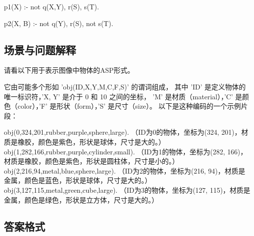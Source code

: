 p1(X) :- not q(X,Y), r(S), s(T).

p2(X, B) :- not q(Y), r(S), not s(T).
\subsection{场景与问题解释}
请看以下用于表示图像中物体的ASP形式。

它由可能多个形如 'obj(ID,X,Y,M,C,F,S)' 的谓词组成，
其中 'ID' 是定义物体的唯一标识符，'X, Y' 是介于 0 和 10 之间的坐标，
'M' 是材质（material），'C' 是颜色（color），'F' 是形状（form），'S' 是尺寸（size）。
以下是这种编码的一个示例片段：

obj(0,324,201,rubber,purple,sphere,large). （ID为0的物体，坐标为(324, 201)，材质是橡胶，颜色是紫色，形状是球体，尺寸是大的。）
obj(1,282,166,rubber,purple,cylinder,small). （ID为1的物体，坐标为(282, 166)，材质是橡胶，颜色是紫色，形状是圆柱体，尺寸是小的。）
obj(2,216,94,metal,blue,sphere,large).   （ID为2的物体，坐标为(216, 94)，材质是金属，颜色是蓝色，形状是球体，尺寸是大的。）
obj(3,127,115,metal,green,cube,large).   （ID为3的物体，坐标为(127, 115)，材质是金属，颜色是绿色，形状是立方体，尺寸是大的。）
\subsection{答案格式}

